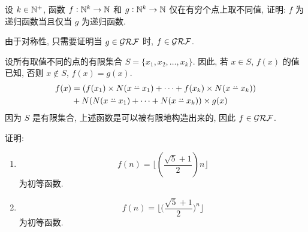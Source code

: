 \begin{problem}
设 $k \in \mathbb{N}^{+}$, 函数 $f : \mathbb{N}^{k} \to \mathbb{N}^{}$ 和 $g: \mathbb{N}^{k} \to \mathbb{N}^{}$ 仅在有穷个点上取不同值, 证明: $f$ 为递归函数当且仅当 $g$ 为递归函数.
\end{problem}

\begin{solution}
由于对称性, 只需要证明当 $g \in \mathcal{GRF}$ 时, $f \in \mathcal{GRF}$.

设所有取值不同的点的有限集合 $S = \{ x_1, x_2, \dots, x_k \}$. 因此, 若 $x \in S$, $f(x)$ 的值已知, 否则 $x \not\in S$, $f(x) = g(x)$.
\begin{align*}
f(x) & = (f(x_1) \times N(x \dotdotminus x_1) + \dots + f(x_k) \times N(x \dotdotminus x_k)) \\
& + N(N(x \dotdotminus x_1) + \dots + N(x \dotdotminus x_k)) \times g(x)
\end{align*}
因为 $S$ 是有限集合, 上述函数是可以被有限地构造出来的, 因此 $f \in \mathcal{GRF}$.
\end{solution}

\begin{problem}
证明:

\begin{enumerate}
    \item $$
f(n) = \Big \lfloor (\frac{\sqrt{5} + 1}{2}) n \Big \rfloor
$$
为初等函数.
    \item $$
f(n) = \Big \lfloor \big (\frac{\sqrt{5} + 1}{2} \big )^{n} \Big \rfloor
$$
为初等函数.
\end{enumerate}
\end{problem}

